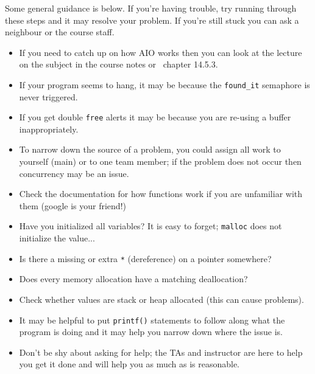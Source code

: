 Some general guidance is below. If you're having trouble, try running through these steps and it may resolve your problem. If you're still stuck you can ask a neighbour or the course staff.
\begin{itemize}
	\item If you need to catch up on how AIO works then you can look at the lecture on the subject in the course notes or~\cite{apunix} chapter 14.5.3.
	\item If your program seems to hang, it may be because the \texttt{found\_it} semaphore is never triggered.
	\item If you get double \texttt{free} alerts it may be because you are re-using a buffer inappropriately.
	\item To narrow down the source of a problem, you could assign all work to yourself (main) or to one team member; if the problem does not occur then concurrency may be an issue.
	\item Check the documentation for how functions work if you are unfamiliar with them (google is your friend!)
	\item Have you initialized all variables? It is easy to forget; \texttt{malloc} does not initialize the value...
	\item Is there a missing or extra \texttt{*} (dereference) on a pointer somewhere?
	\item Does every memory allocation have a matching deallocation?
	\item Check whether values are stack or heap allocated (this can cause problems).
	\item It may be helpful to put \texttt{printf()} statements to follow along what the program is doing and it may help you narrow down where the issue is.
	\item Don't be shy about asking for help; the TAs and instructor are here to help you get it done and will help you as much as is reasonable.
\end{itemize}



